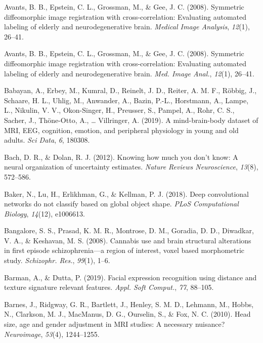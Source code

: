 \documentclass[11pt,american,]{memoir} %
\begin{document}
\leavevmode\hypertarget{ref-avants2008symmetric}{}%
Avants, B. B., Epstein, C. L., Grossman, M., \& Gee, J. C. (2008). Symmetric diffeomorphic image registration with cross-correlation: Evaluating automated labeling of elderly and neurodegenerative brain. \emph{Medical Image Analysis}, \emph{12}(1), 26--41.

\leavevmode\hypertarget{ref-Avants2008-bv}{}%
Avants, B. B., Epstein, C. L., Grossman, M., \& Gee, J. C. (2008). Symmetric diffeomorphic image registration with cross-correlation: Evaluating automated labeling of elderly and neurodegenerative brain. \emph{Med. Image Anal.}, \emph{12}(1), 26--41.

\leavevmode\hypertarget{ref-Babayan2019-mo}{}%
Babayan, A., Erbey, M., Kumral, D., Reinelt, J. D., Reiter, A. M. F., Röbbig, J., Schaare, H. L., Uhlig, M., Anwander, A., Bazin, P.-L., Horstmann, A., Lampe, L., Nikulin, V. V., Okon-Singer, H., Preusser, S., Pampel, A., Rohr, C. S., Sacher, J., Thöne-Otto, A., \ldots{} Villringer, A. (2019). A mind-brain-body dataset of MRI, EEG, cognition, emotion, and peripheral physiology in young and old adults. \emph{Sci Data}, \emph{6}, 180308.

\leavevmode\hypertarget{ref-bach2012knowing}{}%
Bach, D. R., \& Dolan, R. J. (2012). Knowing how much you don't know: A neural organization of uncertainty estimates. \emph{Nature Reviews Neuroscience}, \emph{13}(8), 572--586.

\leavevmode\hypertarget{ref-baker2018deep}{}%
Baker, N., Lu, H., Erlikhman, G., \& Kellman, P. J. (2018). Deep convolutional networks do not classify based on global object shape. \emph{PLoS Computational Biology}, \emph{14}(12), e1006613.

\leavevmode\hypertarget{ref-Bangalore2008-kc}{}%
Bangalore, S. S., Prasad, K. M. R., Montrose, D. M., Goradia, D. D., Diwadkar, V. A., \& Keshavan, M. S. (2008). Cannabis use and brain structural alterations in first episode schizophrenia---a region of interest, voxel based morphometric study. \emph{Schizophr. Res.}, \emph{99}(1), 1--6.

\leavevmode\hypertarget{ref-Barman2019-af}{}%
Barman, A., \& Dutta, P. (2019). Facial expression recognition using distance and texture signature relevant features. \emph{Appl. Soft Comput.}, \emph{77}, 88--105.

\leavevmode\hypertarget{ref-Barnes2010-pu}{}%
Barnes, J., Ridgway, G. R., Bartlett, J., Henley, S. M. D., Lehmann, M., Hobbs, N., Clarkson, M. J., MacManus, D. G., Ourselin, S., \& Fox, N. C. (2010). Head size, age and gender adjustment in MRI studies: A necessary nuisance? \emph{Neuroimage}, \emph{53}(4), 1244--1255.
\end{document}
